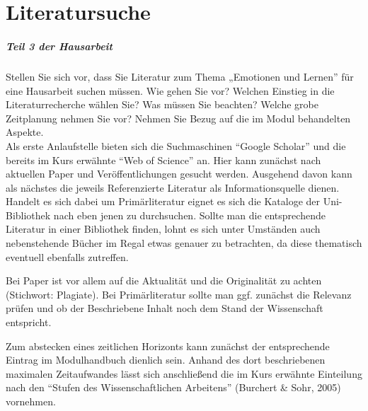%
\chapter{Literatursuche}
\label{sec:literatursuche}

\paragraph{Teil 3 der Hausarbeit}
Stellen Sie sich vor, dass Sie Literatur zum Thema „Emotionen und Lernen” für eine Hausarbeit suchen müssen. Wie gehen Sie vor? Welchen Einstieg in die Literaturrecherche wählen Sie? Was müssen Sie beachten? Welche grobe Zeitplanung nehmen Sie vor? Nehmen Sie Bezug auf die im Modul behandelten Aspekte. \\[0.4em]

Als erste Anlaufstelle bieten sich die Suchmaschinen “Google Scholar” \cite{WEB:GOOGLE:SCHOLAR} und die bereits im Kurs erwähnte “Web of Science” \cite{WEB:KNOWLEDGE}
an. Hier kann zunächst nach aktuellen Paper und Veröffentlichungen gesucht werden. Ausgehend davon kann als nächstes die jeweils Referenzierte Literatur als Informationsquelle dienen. 
Handelt es sich dabei um Primärliteratur eignet es sich die Kataloge der Uni-Bibliothek nach eben jenen zu durchsuchen. Sollte man die entsprechende Literatur in einer Bibliothek finden, lohnt es sich unter Umständen auch nebenstehende Bücher im Regal etwas genauer zu betrachten, da diese thematisch eventuell ebenfalls zutreffen.

Bei Paper ist vor allem auf die Aktualität und die Originalität zu achten (Stichwort: Plagiate). Bei Primärliteratur sollte man ggf. zunächst die Relevanz prüfen und ob der Beschriebene Inhalt noch dem Stand der Wissenschaft entspricht.

Zum abstecken eines zeitlichen Horizonts kann zunächst der entsprechende Eintrag im Modulhandbuch dienlich sein. Anhand des dort beschriebenen maximalen Zeitaufwandes lässt sich anschließend die im Kurs erwähnte Einteilung nach den “Stufen des Wissenschaftlichen Arbeitens” (Burchert \& Sohr, 2005) vornehmen. \cite{WEB:VHB:LuSt1:Inhaltliche-Aspekte}
